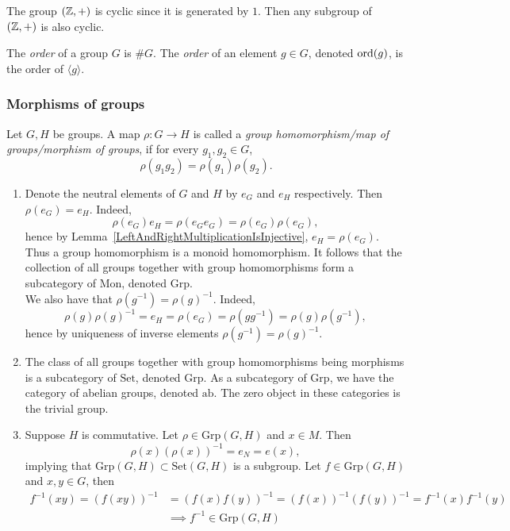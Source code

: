 \begin{example}
    The group $(\mathbb{Z},+)$ is cyclic since it is generated by $1$. Then any subgroup of $(\mathbb{Z},+)$ is also cyclic. 
\end{example}
\begin{definition}
    The \emph{order} of a group $G$ is $\#G$. The \emph{order} of an element $g\in G$, denoted $\mathrm{ord}(g)$, is the order of $\langle g\rangle$.  
\end{definition}

\subsubsection{Morphisms of groups}
\begin{definition}
    Let $G,H$ be groups. A map $\rho : G\rightarrow H$ is called a \textit{group homomorphism/map of groups/morphism of groups}, if for every $g_1,g_2\in G$,
    $$\rho(g_1g_2)=\rho(g_1)\rho(g_2).$$
\end{definition}
\begin{remark}\label{GroupHomomorphismSendsInversesToInversesAndNeutralElementsToNeutralElements}
    \begin{enumerate}
    \item Denote the neutral elements of $G$ and $H$ by $e_G$ and $e_H$ respectively. Then $\rho(e_G)=e_H$. Indeed, 
    $$\rho(e_G)e_H=\rho(e_Ge_G)=\rho(e_G)\rho(e_G),$$
    hence by Lemma~\ref{LeftAndRightMultiplicationIsInjective}, $e_H= \rho(e_G)$. Thus a group homomorphism is a monoid homomorphism. It follows that the collection of all groups together with group homomorphisms form a subcategory of $\mathrm{Mon}$, denoted $\mathrm{Grp}$.\\ 
    We also have that $\rho\left(g^{-1}\right) = \rho(g)^{-1}$. Indeed,
    $$\rho(g)\rho(g)^{-1} = e_H = \rho(e_G)=\rho\left(gg^{-1}\right)=\rho(g)\rho\left(g^{-1}\right),$$
    hence by uniqueness of inverse elements $\rho\left(g^{-1}\right) = \rho(g)^{-1}$.
    \item The class of all groups together with group homomorphisms being morphisms is a subcategory of $\mathrm{Set}$, denoted $\mathrm{Grp}$. As a subcategory of $\mathrm{Grp}$, we have the category of abelian groups, denoted $\mathrm{ab}$. The zero object in these categories is the trivial group. 
    \item Suppose $H$ is commutative. Let $\rho \in \mathrm{Grp}(G,H)$ and $x\in M$. Then 
    $$\rho(x)\left(\rho(x)\right)^{-1}=e_N = e(x),$$
    implying that $\mathrm{Grp}(G,H)\subset \mathrm{Set}(G,H)$ is a subgroup. Let $f\in \mathrm{Grp}(G,H)$ and $x,y\in G$, then 
    \begin{align*} 
        f^{-1}(xy) = \left(f(xy)\right)^{-1} &= \left(f(x)f(y)\right)^{-1} = \left(f(x)\right)^{-1}\left(f(y)\right)^{-1} = f^{-1}(x)f^{-1}(y)\\ 
        &\implies f^{-1}\in \mathrm{Grp}(G,H)
    \end{align*}
    \end{enumerate}
\end{remark}
